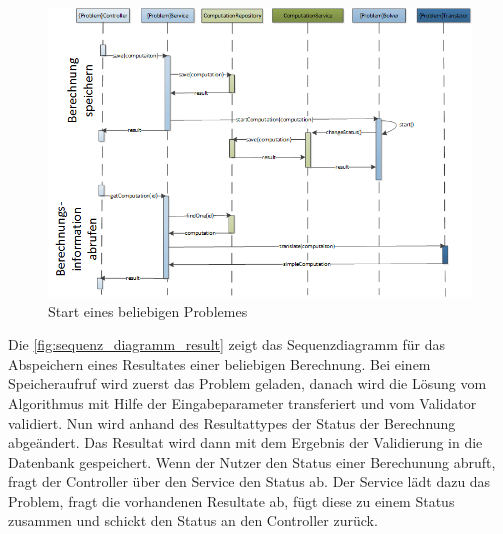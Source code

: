 \begin{figure}[h]
\centering
\includegraphics[scale=0.8]{images/visio/sequenz_diagramm_start.png}
\caption[Start eines beliebigen Problemes]{Start eines beliebigen Problemes \selfmade{}}
\label{fig:sequenz_diagramm_start}
\end{figure}

\newpage

Die \autoref{fig:sequenz_diagramm_result} zeigt das Sequenzdiagramm für das Abspeichern eines Resultates einer beliebigen Berechnung. Bei einem Speicheraufruf wird zuerst das Problem 
geladen, danach wird die Lösung vom Algorithmus mit Hilfe der Eingabeparameter transferiert und vom Validator validiert. Nun wird anhand des Resultattypes der Status der Berechnung 
abgeändert. Das Resultat wird dann mit dem Ergebnis der Validierung in die Datenbank gespeichert. Wenn der Nutzer den Status einer Berechunung abruft, fragt der Controller über den 
Service den Status ab. Der Service lädt dazu das Problem, fragt die vorhandenen Resultate ab, fügt diese zu einem Status zusammen und schickt den Status an den Controller zurück.

